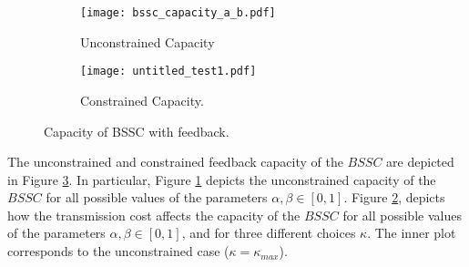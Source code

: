 \documentclass[11pt, a4paper, journal,onecolumn]{IEEEtran}
\newcommand{\bea}{\begin{eqnarray}}
\newcommand{\eea}{\end{eqnarray}}
\newcommand{\hst}{\hspace{.2in}}
\begin{document}
\begin{figure}
    \centering
    \begin{subfigure}[b]{0.47\textwidth}
        \centering
\texttt{[image: bssc\_capacity\_a\_b.pdf]}
        \caption{Unconstrained Capacity}\label{fig.DP.bssc.con.cap_a}
    \end{subfigure}
    \hfill
    \begin{subfigure}[b]{0.5\textwidth}
        \centering
        \texttt{[image: untitled\_test1.pdf]}      
        \caption{Constrained Capacity.}\label{fig.DP.bssc.con.cap_b}
    \end{subfigure}
    \caption{Capacity of BSSC with feedback.}\label{fig.DP.bssc.con.cap}
\end{figure}

The unconstrained and constrained feedback  capacity of the $BSSC$ are depicted in Figure \ref{fig.DP.bssc.con.cap}. In particular, Figure \ref{fig.DP.bssc.con.cap_a} depicts the unconstrained capacity of the $BSSC$  for all possible values of the parameters $\alpha,\beta\in[0,1]$. Figure \ref{fig.DP.bssc.con.cap_b}, depicts how the transmission cost affects the capacity of the $BSSC$ for all possible values of the parameters $\alpha,\beta\in[0,1]$, and for three different choices $\kappa$. The inner plot corresponds to the unconstrained case ($\kappa=\kappa_{max}$).
\end{document}
